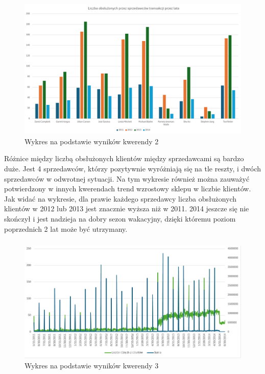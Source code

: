 \documentclass[a4paper,12pt]{article}
\begin{document}
\subsubsection{}

\begin{figure}[H]
    \centering
    \includegraphics[width=1.0\textwidth]{images/excel/02.png}
    \caption{Wykres na podstawie wyników kwerendy 2}
\end{figure}

Różnice między liczbą obsłużonych klientów między sprzedawcami są bardzo duże. Jest 4 sprzedawców, którzy pozytywnie wyróżniają się na tle reszty, i dwóch sprzedawców w odwrotnej sytuacji. Na tym wykresie również można zauważyć potwierdzony w innych kwerendach trend wzrostowy sklepu w liczbie klientów. Jak widać na wykresie, dla prawie każdego sprzedawcy liczba obsłużonych klientów w 2012 lub 2013 jest znacznie wyższa niż w 2011. 2014 jeszcze się nie skończył i jest nadzieja na dobry sezon wakacyjny, dzięki któremu poziom poprzednich 2 lat może być utrzymany.

\subsubsection{}

\begin{figure}[H]
    \centering
    \includegraphics[width=1.0\textwidth]{images/excel/03.png}
    \caption{Wykres na podstawie wyników kwerendy 3}
\end{figure}
\end{document}
